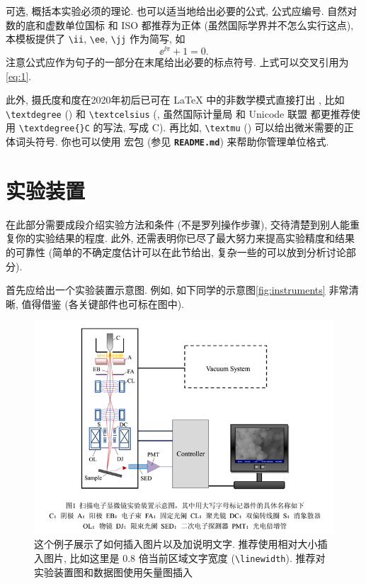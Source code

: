 \documentclass[font=default]{mpltx}
\newcommand{\note}[1]{{\color{gray}#1}}
\newcommand*\cs[1]{\texttt{\textbackslash #1}}
\newcommand*\code[1]{\texttt{#1}}
\newcommand*\file[1]{\textbf{\texttt{#1}}}
\begin{document}
可选, 概括本实验必须的理论.
也可以适当地给出必要的公式, 公式应编号.
\note{自然对数的底和虚数单位国标 \cite{GBT3102.11} 和 ISO \cite{ISO80000-2} 都推荐为正体 (虽然国际学界并不怎么实行这点), 本模板提供了 \cs{ii}, \cs{ee}, \cs{jj} 作为简写, 如
  \begin{equation}\label{eq:1}
    \ee^{\ii\pi}+1=0.
  \end{equation}
  注意公式应作为句子的一部分在末尾给出必要的标点符号.
  上式可以交叉引用为\autoref{eq:1}.}

\note{此外, 摄氏度和度在2020年初后已可在 \LaTeX{} 中的非数学模式直接打出 \cite{fntguide},
  比如 \cs{textdegree} (\textdegree) 和 \cs{textcelsius} (\textcelsius, 虽然国际计量局 \cite{si} 和 Unicode 联盟 \cite{unicode} 都更推荐使用 \code{\textbackslash{}textdegree\{\}C} 的写法, 写成 \textdegree{}C).
  再比如, \cs{textmu} (\textmu) 可以给出微米需要的正体词头符号.
  你也可以使用 \pkg{siunitx} 宏包 (参见 \file{README.md}) 来帮助你管理单位格式.}

\section{实验装置}
在此部分需要成段介绍实验方法和条件 (不是罗列操作步骤), 交待清楚到别人能重复你的实验结果的程度.
此外, 还需表明你已尽了最大努力来提高实验精度和结果的可靠性 (简单的不确定度估计可以在此节给出, 复杂一些的可以放到分析讨论部分).

首先应给出一个实验装置示意图.
例如, 如下同学的示意图\autoref{fig:instruments} 非常清晰, 值得借鉴 (各关键部件也可标在图中).

\begin{figure}
  \centering
  \includegraphics[width=0.85\linewidth]{fig/instruments.png}
  \caption{这个例子展示了如何插入图片以及加说明文字.
    \note{推荐使用相对大小插入图片, 比如这里是 0.8 倍当前区域文字宽度 (\cs{linewidth}).
      推荐对实验装置图和数据图使用矢量图插入}}
  \label{fig:instruments}
\end{figure}
\end{document}
